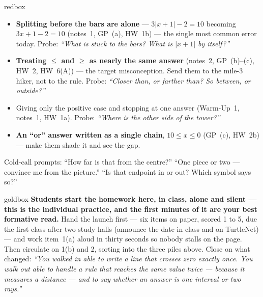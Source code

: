 \documentclass[10pt]{article}
\begin{document}
\boxguard
\begin{skillbox}{redbox}
\begin{itemize}[leftmargin=1.2em, nosep]
  \item \textbf{Splitting before the bars are alone} --- $3|x+1|-2=10$ becoming $3x+1-2=10$
        (notes~1, GP~(a), HW~1b) --- the single most common error today. Probe: \emph{``What is
        stuck to the bars? What is $|x+1|$ by itself?''}
  \item \textbf{Treating $\le$ and $\ge$ as nearly the same answer} (notes~2, GP~(b)--(c), HW~2,
        HW~6(A)) --- the target misconception. Send them to the mile-3 hiker, not to the rule.
        Probe: \emph{``Closer than, or farther than? So between, or outside?''}
  \item Giving only the positive case and stopping at one answer (Warm-Up~1, notes~1, HW~1a).
        Probe: \emph{``Where is the other side of the tower?''}
  \item \textbf{An ``or'' answer written as a single chain}, $10\le x\le0$ (GP~(c), HW~2b) ---
        make them shade it and see the gap.
\end{itemize}
Cold-call prompts: ``How far is that from the centre?'' ``One piece or two --- convince me from
the picture.'' ``Is that endpoint in or out? Which symbol says so?''
\end{skillbox}

\boxguard
\begin{skillbox}{goldbox}
\textbf{Students start the homework here, in class, alone and silent --- this is the individual
practice, and the first minutes of it are your best formative read.} Hand the launch first ---
six items on paper, scored 1 to 5, due the first class after two study halls (announce the date in class and on TurtleNet) --- and work item~1(a) aloud in thirty seconds so
nobody stalls on the page. Then circulate on 1(b) and 2, sorting into the three piles above.
Close on what changed: \emph{``You walked in able to write a line that crosses zero exactly once.
You walk out able to handle a rule that reaches the same value twice --- because it measures a
distance --- and to say whether an answer is one interval or two rays.''}
\end{skillbox}
\end{document}

